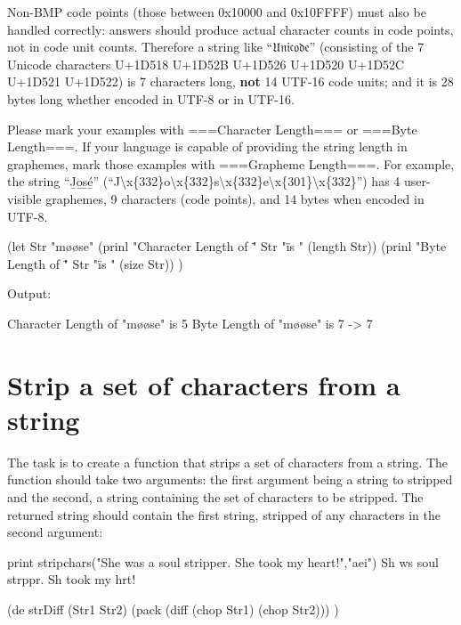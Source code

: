 \begin{itemize}
Non-BMP code points (those between 0x10000 and 0x10FFFF) must also be
handled correctly: answers should produce actual character counts in
code points, not in code unit counts. Therefore a string like
``𝔘𝔫𝔦𝔠𝔬𝔡𝔢'' (consisting of the 7 Unicode characters U+1D518 U+1D52B
U+1D526 U+1D520 U+1D52C U+1D521 U+1D522) is 7 characters long,
\textbf{not} 14 UTF-16 code units; and it is 28 bytes long whether
encoded in UTF-8 or in UTF-16.

Please mark your examples with ===Character Length=== or ===Byte
Length===. If your language is capable of providing the string length in
graphemes, mark those examples with ===Grapheme Length===. For example,
the string ``J̲o̲s̲é̲''
(``J\textbackslash{}x\{332\}o\textbackslash{}x\{332\}s\textbackslash{}x\{332\}e\textbackslash{}x\{301\}\textbackslash{}x\{332\}'')
has 4 user-visible graphemes, 9 characters (code points), and 14 bytes
when encoded in UTF-8.



\begin{wideverbatim}

(let Str "møøse"
   (prinl "Character Length of \"" Str "\" is " (length Str))
   (prinl "Byte Length of \"" Str "\" is " (size Str)) )

Output:

Character Length of "møøse" is 5
Byte Length of "møøse" is 7
-> 7

\end{wideverbatim}

\pagebreak{}
\section*{Strip a set of characters from a string}

The task is to create a function that strips a set of characters from a
string. The function should take two arguments: the first argument being
a string to stripped and the second, a string containing the set of
characters to be stripped. The returned string should contain the first
string, stripped of any characters in the second argument:

\begin{wideverbatim}
print stripchars("She was a soul stripper. She took my heart!","aei")
Sh ws  soul strppr. Sh took my hrt!
\end{wideverbatim}

\begin{wideverbatim}

(de strDiff (Str1 Str2)
   (pack (diff (chop Str1) (chop Str2))) )


\end{wideverbatim}
\end{itemize}
